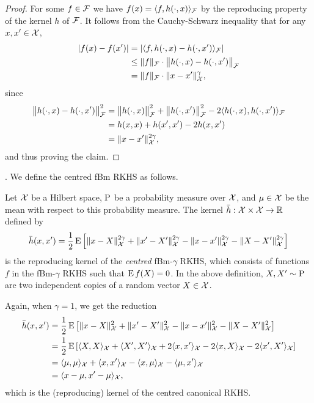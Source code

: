 \begin{proof}
  For some $f \in {\mathcal F}$ we have $f(x) = \langle f,h(\cdot,x)\rangle_{\mathcal F}$ by the reproducing property of the kernel $h$ of ${\mathcal F}$.
  It follows from the Cauchy-Schwarz inequality that for any $x,x'\in{\mathcal X}$,
  \begin{align*}
    \vert f(x) - f(x') \vert 
    &= \vert \langle f,h(\cdot,x) - h(\cdot,x')\rangle_{\mathcal F} \vert \\
    &\leq \lVert f\rVert_{\mathcal F} \cdot \big\Vert h(\cdot,x) - h(\cdot,x') \big\Vert_{\mathcal F} \\
    &= \lVert f\rVert_{\mathcal F} \cdot \lVert x-x'\rVert_{\mathcal X}^{\gamma},
  \end{align*}
  since
  \begin{align*}
    \big\Vert h(\cdot,x) - h(\cdot,x') \big\Vert_{\mathcal F} ^2
    &= \big\Vert h(\cdot,x) \big\Vert_{\mathcal F} ^2 + \big\Vert h(\cdot,x') \big\Vert_{\mathcal F} ^2 - 2 \langle h(\cdot,x),h(\cdot,x')\rangle_{\mathcal F} \\
    &= h(x,x) + h(x',x') - 2 h(x,x') \\
    &= \lVert x-x'\rVert_{\mathcal X}^{2\gamma},
  \end{align*}  
  and thus proving the claim.
\end{proof}

.
We define the centred fBm RKHS as follows.

\begin{definition}
  Let ${\mathcal X}$ be a Hilbert space, $\operatorname{P}$ be a probability measure over ${\mathcal X}$, and $\mu\in{\mathcal X}$ be the mean 
  with respect to this probability measure.
  The kernel $\bar h:{\mathcal X}\times{\mathcal X}\to\mathbb{R}$ defined by
  \[
    \bar h(x,x') = \frac{1}{2} \operatorname{E} \left[ \lVert x-X\rVert_{\mathcal X}^{2\gamma} + \lVert x'-X'\rVert_{\mathcal X}^{2\gamma} - \lVert x-x'\rVert_{\mathcal X}^{2\gamma} - \lVert X-X'\rVert_{\mathcal X}^{2\gamma} \right]
  \]
  is the reproducing kernel of the \emph{centred} fBm-$\gamma$ RKHS, which consists of functions $f$ in the fBm-$\gamma$ RKHS such that $\operatorname{E} f(X) = 0$.
  In the above definition, $X,X' \sim \operatorname{P}$ are two independent copies of a random vector $X \in {\mathcal X}$.
\end{definition}

\begin{remark}
  Again, when $\gamma=1$, we get the reduction 
  \begin{align*}
    \bar h(x,x') 
    &= \frac{1}{2} \operatorname{E} \left[ \lVert x-X\rVert_{\mathcal X}^{2} + \lVert x'-X'\rVert_{\mathcal X}^{2} - \lVert x-x'\rVert_{\mathcal X}^{2} - \lVert X-X'\rVert_{\mathcal X}^{2} \right] \\
    &= \frac{1}{2} \operatorname{E} \left[ \langle X,X\rangle_{\mathcal X} + \langle X',X'\rangle_{\mathcal X} + 2\langle x,x'\rangle_{\mathcal X} - 2\langle x,X\rangle_{\mathcal X} - 2\langle x',X'\rangle_{\mathcal X}\right] \\
    &= \langle\mu,\mu\rangle_{\mathcal X} + \langle x,x'\rangle_{\mathcal X} - \langle x,\mu\rangle_{\mathcal X} - \langle\mu,x'\rangle_{\mathcal X} \\
    &= \langle x-\mu,x'-\mu\rangle_{\mathcal X},
  \end{align*}
  which is the (reproducing) kernel of the centred canonical RKHS.
\end{remark}

